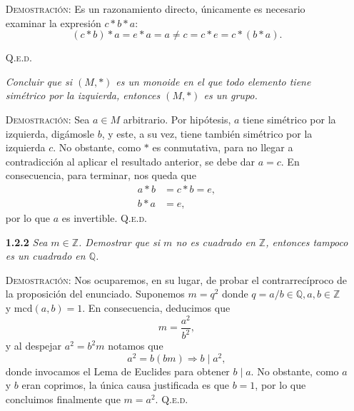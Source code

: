 \documentclass{article}
\newcommand{\mcd}{\text{mcd}}
\begin{document}
\begin{enumerate}
    \vspace{7px}

    \textsc{Demostración}: Es un razonamiento directo, únicamente es necesario examinar la expresión $c * b * a$: \[(c * b) * a = e * a = a \neq c = c * e = c * (b * a).\]

    \hfill{\textsc{Q.e.d.}}

    \vspace{7px}

    \newpage

    \textit{Concluir que si $(M, *)$ es un monoide en el que todo elemento tiene simétrico por la izquierda, entonces $(M, *)$ es un grupo.}

    \vspace{7px}

    \textsc{Demostración}: Sea $a \in M$ arbitrario. Por hipótesis, $a$ tiene simétrico por la izquierda, digámosle $b$, y este, a su vez, tiene también simétrico por la izquierda $c$. No obstante, como $*$ es conmutativa, para no llegar a contradicción al aplicar el resultado anterior, se debe dar $a = c$. En consecuencia, para terminar, nos queda que
    \begin{equation*}
    \begin{split}
        a * b & = c * b = e, \\
        b * a & = e,
    \end{split}
    \end{equation*}
    por lo que $a$ es invertible. \hfill{\textsc{Q.e.d.}}

    \vspace{12px}

    \item[\textbf{1.2.2}] \textit{Sea $m \in \mathbb{Z}$. Demostrar que si $m$ no es cuadrado en $\mathbb{Z}$, entonces tampoco es un cuadrado en $\mathbb{Q}$.}

    \vspace{7px}

    \textsc{Demostración}: Nos ocuparemos, en su lugar, de probar el contrarrecíproco de la proposición del enunciado. Suponemos $m = q^2$ donde $q = a / b \in \mathbb{Q}, a, b \in \mathbb{Z}$ y $\mcd(a, b) = 1$. En consecuencia, deducimos que \[m = \frac{a^2}{b^2},\] y al despejar $a^2 = b^2m$ notamos que \[a^2 = b(bm) \Longrightarrow b \mid a^2,\] donde invocamos el Lema de Euclides para obtener $b \mid a$. No obstante, como $a$ y $b$ eran coprimos, la única causa justificada es que $b = 1$, por lo que concluimos finalmente que $m = a^2$. \hfill{\textsc{Q.e.d.}}


\end{enumerate}
\end{document}
